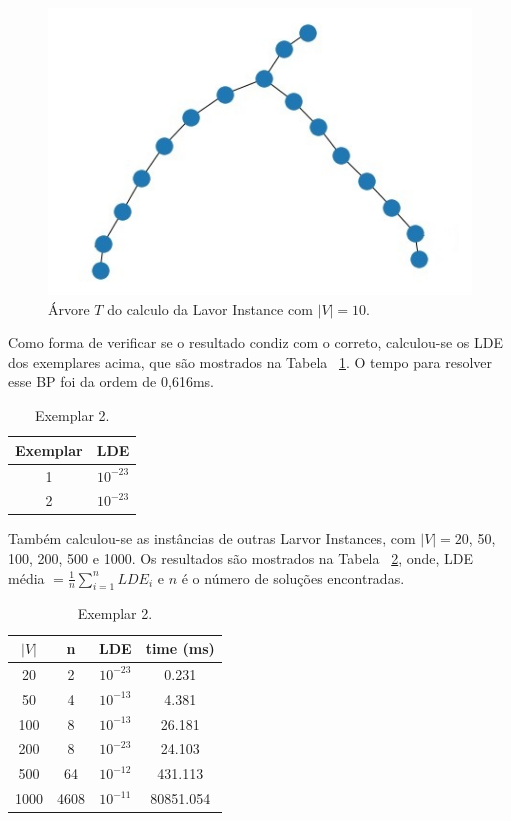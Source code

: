 \documentclass[a4paper,12pt]{article}
\begin{document}
	\begin{figure}[H]
		\begin{center}
			\includegraphics[width=0.45\linewidth]{lavor10.jpeg}
		\end{center}
		\caption{Árvore $T$ do calculo da Lavor Instance com $|V| = 10$.}
		\label{fig:arvore}
	\end{figure}
	
	Como forma de verificar se o resultado condiz com o correto, calculou-se os LDE dos exemplares acima, que são mostrados na Tabela ~\ref{tab:resul}. O tempo para resolver esse BP foi da ordem de 0,616ms.
	
	\begin{table}[H]
		\centering
		\begin{tabular}{ |c c| } 
			\hline
			\textbf{Exemplar} & \textbf{LDE} \\\hline
			1 & $10^{-23}$\\
			2 & $10^{-23}$\\\hline
		\end{tabular}
		\caption{Exemplar 2.}
		\label{tab:resul}
	\end{table}
	
	Também calculou-se as instâncias de outras Larvor Instances, com $|V| = 20$, 50, 100, 200, 500 e 1000. Os resultados são mostrados na Tabela ~\ref{tab:resul2}, onde, LDE média $= \frac{1}{n}\sum_{i=1}^{n}LDE_i$ e $n$ é o número de soluções encontradas.
	
	\begin{table}[H]
		\centering
		\begin{tabular}{ |c c c c| } 
			\hline
			\textbf{$|V|$} & n & \textbf{LDE} & \textbf{time (ms)} \\\hline
			20 & 2 & $10^{-23}$& 0.231 \\
			50 & 4 & $10^{-13}$& 4.381\\\hline
			100 & 8 & $10^{-13}$& 26.181 \\\hline
			200 & 8 & $10^{-23}$& 24.103\\\hline
			500 & 64 & $10^{-12}$& 431.113 \\\hline
			1000 & 4608 & $10^{-11}$& 80851.054 \\\hline
		\end{tabular}
		\caption{Exemplar 2.}
		\label{tab:resul2}
	\end{table}
	
\end{document}
